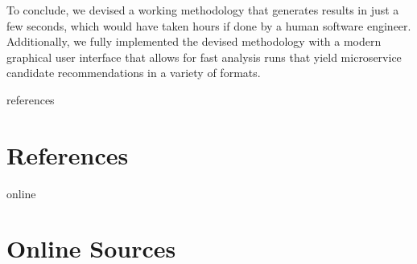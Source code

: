 \documentclass[12pt,a4paper]{report}
\begin{document}
To conclude, we devised a working methodology that generates results
in just a few seconds, which would have taken hours if done
by a human software engineer.
Additionally, we fully implemented the devised methodology with a
modern graphical user interface that allows for fast analysis runs
that yield microservice candidate recommendations in a variety of formats.




\newpage
{}
\listoffigures
\newpage
{}
\listoftables
\newpage
{}

\begin{btSect}{references}
\section*{\huge{References}}
\btPrintCited
\end{btSect}
\begin{btSect}{online}
\section*{\huge{Online Sources}}
\btPrintCited
\end{btSect}
\end{document}

